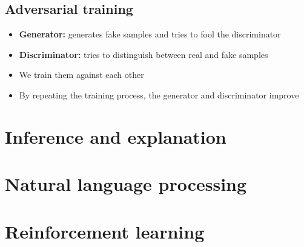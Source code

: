 \documentclass{article}
\begin{document}
        \subsection{Adversarial training}
        \begin{itemize}
            \item \textbf{Generator:} generates fake samples and tries to fool the discriminator
            \item \textbf{Discriminator:} tries to distinguish between real and fake samples
            \item We train them against each other
            \item By repeating the training process, the generator and discriminator improve
        \end{itemize}

    \newpage

\section{Inference and explanation}
    \newpage

\section{Natural language processing}
    \newpage

\section{Reinforcement learning}
    \newpage
\end{document}
